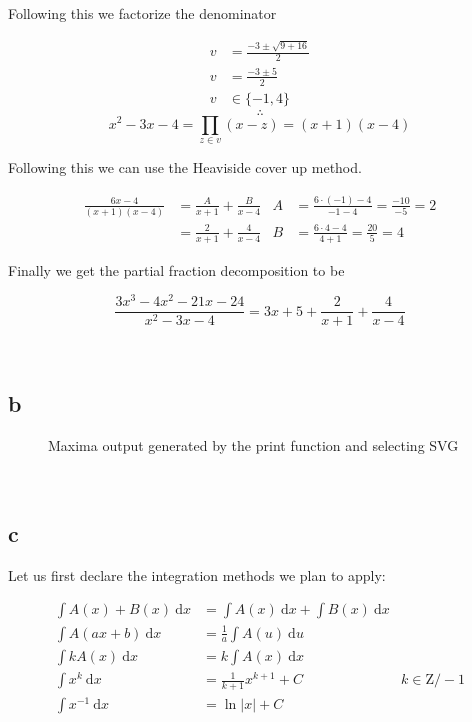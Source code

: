 \documentclass{article}
\newcommand{\md}{~\mathrm d}
\newcommand{\blankpage}{
    \newpage
    \
    \newpage
}
\begin{document}
Following this we factorize the denominator

\begin{align*}
    v &= \frac{-3 \pm \sqrt{9 + 16}}{2} \\
    v &= \frac{-3 \pm 5}2 \\
    v &\in \{ -1,4 \}
\end{align*}
$$\therefore$$
$$x^2 - 3x - 4 = \prod_{z \in v}(x - z) = (x + 1) (x - 4)$$

Following this we can use the Heaviside cover up method.

\begin{align*}
    \frac{6 x - 4}{(x + 1) (x - 4)} &= \frac A {x + 1} + \frac B {x - 4}
    & A &= \frac{6 \cdot (-1) - 4}{-1 - 4} = \frac{-10}{-5} = 2 \\
        &= \frac 2 {x + 1} + \frac 4 {x - 4}
        & B &= \frac{6 \cdot 4 - 4}{4 + 1} = \frac{20}5 = 4
\end{align*}

Finally we get the partial fraction decomposition to be

$$\frac{3 x^3 - 4 x^2 - 21 x - 24}{x ^ 2 - 3  x - 4} = 3x + 5 + \frac2{x+1}+\frac4{x-4}$$

\blankpage
\subsection{b}

\begin{figure}[H]
    \centering
    \label{fig:maximaout}
    \caption{Maxima output generated by the print function and selecting SVG}
\end{figure}

\blankpage
\subsection{c}

Let us first declare the integration methods we plan to apply:

\begin{align*}
    \int A(x) + B(x) \md x &= \int A(x) \md x + \int B(x) \md x \\
    \int A(ax + b) \md x   &= \frac 1a \int A(u) \md u \\
    \int k A(x) \md x      &= k \int A(x) \md x \\
    \int x^k \md x         &= \frac 1 {k+1} x^{k+1} + C & k \in \mathrm Z/-1 \\
    \int x^{-1} \md x      &= \ln {|x|} + C
\end{align*}
\end{document}
